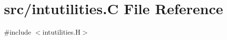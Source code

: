 \hypertarget{intutilities_8_c}{}\section{src/intutilities.C File Reference}
\label{intutilities_8_c}
{\ttfamily \#include $<$intutilities.\+H$>$}\newline
